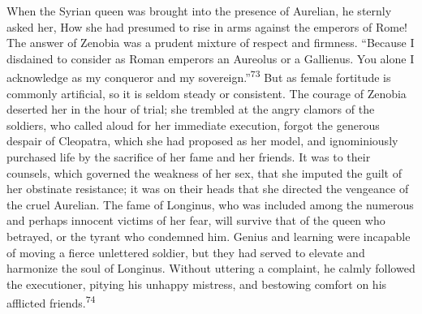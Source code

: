 

When the Syrian queen was brought into the presence of Aurelian,
he sternly asked her, How she had presumed to rise in arms
against the emperors of Rome! The answer of Zenobia was a prudent
mixture of respect and firmness. “Because I disdained to consider
as Roman emperors an Aureolus or a Gallienus. You alone I
acknowledge as my conqueror and my sovereign.”\textsuperscript{73} But as female
fortitude is commonly artificial, so it is seldom steady or
consistent. The courage of Zenobia deserted her in the hour of
trial; she trembled at the angry clamors of the soldiers, who
called aloud for her immediate execution, forgot the generous
despair of Cleopatra, which she had proposed as her model, and
ignominiously purchased life by the sacrifice of her fame and her
friends. It was to their counsels, which governed the weakness of
her sex, that she imputed the guilt of her obstinate resistance;
it was on their heads that she directed the vengeance of the
cruel Aurelian. The fame of Longinus, who was included among the
numerous and perhaps innocent victims of her fear, will survive
that of the queen who betrayed, or the tyrant who condemned him.
Genius and learning were incapable of moving a fierce unlettered
soldier, but they had served to elevate and harmonize the soul of
Longinus. Without uttering a complaint, he calmly followed the
executioner, pitying his unhappy mistress, and bestowing comfort
on his afflicted friends.\textsuperscript{74}



